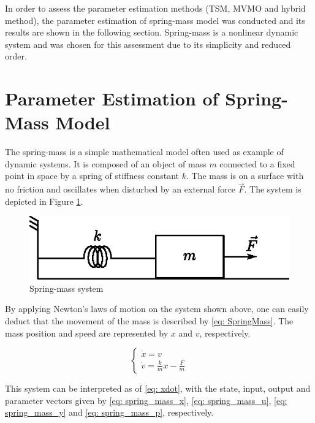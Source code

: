 In order to assess the parameter estimation methods (TSM, MVMO and hybrid method), the parameter estimation of spring-mass model was conducted and its results are shown in the following section. Spring-mass is a nonlinear dynamic system and was chosen for this assessment due to its simplicity and reduced order.

\section{Parameter Estimation of Spring-Mass Model}

The spring-mass is a simple mathematical model often used as example of dynamic systems. It is composed of an object of mass $m$ connected to a fixed point in space by a spring of stiffness constant $k$. The mass is on a surface with no friction and oscillates when disturbed by an external force $\vec{F}$. The system is depicted in Figure \ref{fig: spring_mass}.

\begin{figure}[h]
	\caption{Spring-mass system}
	\begin{center}
		\includegraphics[scale=1]{Images/spring_mass.eps}
	\end{center}
	\label{fig: spring_mass}
\end{figure}

By applying Newton's laws of motion on the system shown above, one can easily deduct that the movement of the mass is described by \eqref{eq: SpringMass}. The mass position and speed are represented by $x$ and $v$, respectively.

\begin{equation}
	\begin{cases}
		\dot{x} = v \\
		\dot{v} = \frac{k}{m}x - \frac{F}{m}
	\end{cases}
	\label{eq: SpringMass}
\end{equation}

This system can be interpreted as of \eqref{eq: xdot}, with the state, input, output and parameter vectors given by \eqref{eq: spring_mass_x}, \eqref{eq: spring_mass_u}, \eqref{eq: spring_mass_y} and \eqref{eq: spring_mass_p}, respectively.

